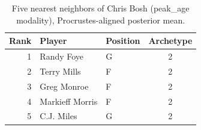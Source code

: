 \begin{table}[htbp]
  \centering\small
  \begin{tabular}{rllc}
    \toprule
    Rank & Player & Position & Archetype \\
    \midrule
    1 & Randy Foye & G & 2 \\
    2 & Terry Mills & F & 2 \\
    3 & Greg Monroe & F & 2 \\
    4 & Markieff Morris & F & 2 \\
    5 & C.J. Miles & G & 2 \\
    \bottomrule
  \end{tabular}
  \caption{Five nearest neighbors of Chris Bosh (peak_age modality), Procrustes-aligned posterior mean.}
  \label{tab:Chris_Bosh_neighbors_peak_age}
\end{table}

